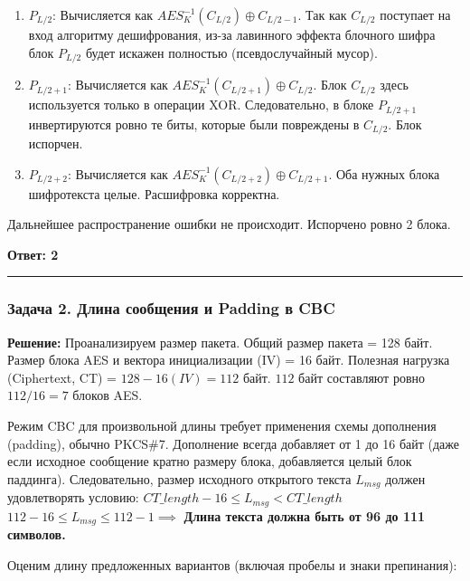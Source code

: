 ﻿\documentclass[9pt,a4paper]{extarticle}
\newcommand{\tightlist}{}
\begin{document}
\begin{enumerate}
\def\labelenumi{\arabic{enumi}.}
\tightlist
\item
  \textbf{\(P_{L/2}\)}: Вычисляется как \(AES^{-1}_K(C_{L/2}) \oplus C_{L/2 - 1}\). Так как \(C_{L/2}\) поступает на вход алгоритму дешифрования, из-за лавинного эффекта блочного шифра блок \(P_{L/2}\) будет искажен полностью (псевдослучайный мусор).
\item
  \textbf{\(P_{L/2 + 1}\)}: Вычисляется как \(AES^{-1}_K(C_{L/2 + 1}) \oplus C_{L/2}\). Блок \(C_{L/2}\) здесь используется только в операции XOR. Следовательно, в блоке \(P_{L/2 + 1}\) инвертируются ровно те биты, которые были повреждены в \(C_{L/2}\). Блок испорчен.
\item
  \textbf{\(P_{L/2 + 2}\)}: Вычисляется как \(AES^{-1}_K(C_{L/2 + 2}) \oplus C_{L/2 + 1}\). Оба нужных блока шифротекста целые. Расшифровка корректна.
\end{enumerate}

Дальнейшее распространение ошибки не происходит. Испорчено ровно 2 блока.

\textbf{Ответ: 2}

\begin{center}\rule{0.5\linewidth}{0.5pt}\end{center}

\subsubsection{Задача 2. Длина сообщения и Padding в CBC}\label{ux437ux430ux434ux430ux447ux430-2.-ux434ux43bux438ux43dux430-ux441ux43eux43eux431ux449ux435ux43dux438ux44f-ux438-padding-ux432-cbc}

\textbf{Решение:} Проанализируем размер пакета. Общий размер пакета = 128 байт. Размер блока AES и вектора инициализации (IV) = 16 байт. Полезная нагрузка (Ciphertext, CT) = \(128 - 16 (IV) = 112\) байт. \(112\) байт составляют ровно \(112 / 16 = 7\) блоков AES.

Режим CBC для произвольной длины требует применения схемы дополнения (padding), обычно PKCS\#7. Дополнение всегда добавляет от 1 до 16 байт (даже если исходное сообщение кратно размеру блока, добавляется целый блок паддинга). Следовательно, размер исходного открытого текста \(L_{msg}\) должен удовлетворять условию: \(CT\_length - 16 \le L_{msg} < CT\_length\) \(112 - 16 \le L_{msg} \le 112 - 1 \implies\) \textbf{Длина текста должна быть от 96 до 111 символов.}

Оценим длину предложенных вариантов (включая пробелы и знаки препинания):
\end{document}
